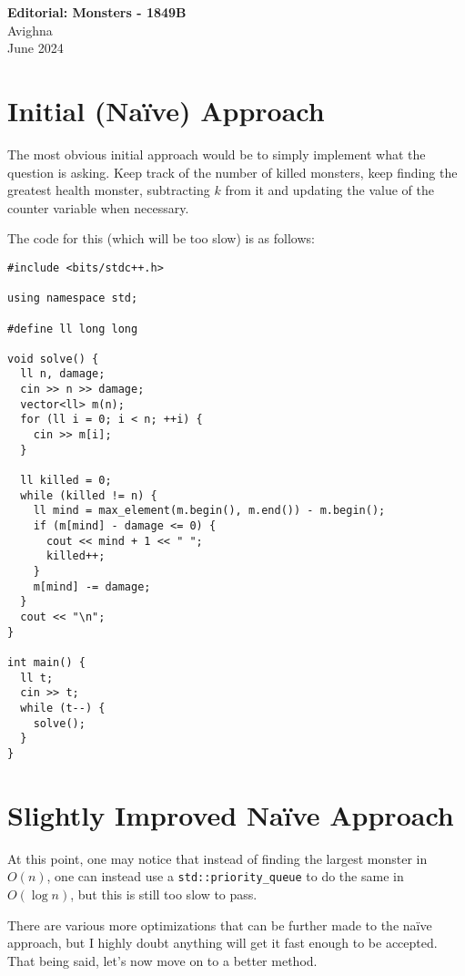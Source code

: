 \documentclass{article}
\begin{document}
\begin{center}
  \large{\textbf{Editorial: Monsters - 1849B}}\\
  \vspace{0.2em}
  \large{Avighna}\\
  \vspace{0.2em}
  \large{June 2024}
\end{center}

\section{Initial (Naïve) Approach}

The most obvious initial approach would be to simply implement what the question is asking. Keep track of the number of killed monsters, keep finding the greatest health monster, subtracting $k$ from it and updating the value of the counter variable when necessary.

The code for this (which will be too slow) is as follows:

\begin{verbatim}
#include <bits/stdc++.h>
 
using namespace std;
 
#define ll long long
 
void solve() {
  ll n, damage;
  cin >> n >> damage;
  vector<ll> m(n);
  for (ll i = 0; i < n; ++i) {
    cin >> m[i];
  }
 
  ll killed = 0;
  while (killed != n) {
    ll mind = max_element(m.begin(), m.end()) - m.begin();
    if (m[mind] - damage <= 0) {
      cout << mind + 1 << " ";
      killed++;
    }
    m[mind] -= damage;
  }
  cout << "\n";
}
 
int main() {
  ll t;
  cin >> t;
  while (t--) {
    solve();
  }
}
\end{verbatim}

\section{Slightly Improved Naïve Approach}

At this point, one may notice that instead of finding the largest monster in $O(n)$, one can instead use a \texttt{std::priority\_queue} to do the same in $O(\log{n})$, but this is still too slow to pass.

There are various more optimizations that can be further made to the naïve approach, but I highly doubt anything will get it fast enough to be accepted. That being said, let's now move on to a better method.
\end{document}
